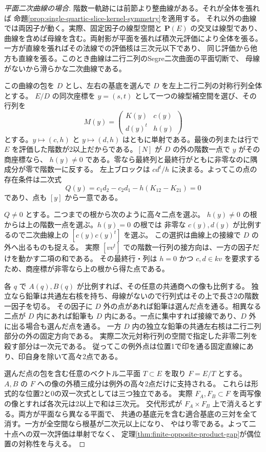 \begin{proof}[平面二次曲線の場合]
階数一軌跡には前節より整曲線がある。それが全体を張れば
命題\ref{prop:single-quartic-slice-kernel-symmetry}を適用する。
それ以外の曲線では両因子が動く。実際、固定因子の線型空間と $\mathbf P(E)$ の交叉は線型であり、
曲線を含めば母線を含む。両射影が平面を張れば積次元評価により全体を張る。
一方が直線を張ればその法線での評価核は三次元以下であり、
同じ評価から他方も直線を張る。このとき曲線は二行二列のSegre二次曲面の平面切断で、
母線がないから滑らかな二次曲線である。

この曲線の包を $D$ とし、左右の基底を選んで $D$ を左上二行二列の対称行列全体とする。
$E/D$ の同次座標を $y=(s,t)$ として一つの線型補空間を選び、その行列を
\[
 M(y)=\begin{pmatrix}K(y)&c(y)\\ d(y)^t&h(y)\end{pmatrix}
\]
とする。$y\mapsto (c,h)$ と $y\mapsto(d,h)$ はともに単射である。最後の列または行で
$E$ を評価した階数が2以上だからである。$[N]$ が $D$ の外の階数一点で $y$ がその商座標なら、
$h(y)\ne0$ である。零なら最終列と最終行がともに非零なのに隅成分が零で階数一に反する。
左上ブロックは $c d^t/h$ に決まる。よってこの点の存在条件は二次式
\[
 Q(y)=c_1d_2-c_2d_1-h(K_{12}-K_{21})=0
\]
であり、点も $[y]$ から一意である。

$Q\ne0$ とする。二つまでの根から次のように高々二点を選ぶ。
$h(y)\ne0$ の根からは上の階数一点を選ぶ。$h(y)=0$ の根では
非零な $c(y),d(y)$ が比例するので二次曲線上の $[c(y)c(y)^t]$ を選ぶ。
この選択は曲線上の接線で $D$ の外へ出るものも捉える。
実際 $[vv^t]$ での階数一行列の接方向は、一方の因子だけを動かす二項の和である。
その最終行・列は $h=0$ かつ $c,d\in kv$ を要求するため、商座標が非零なら上の根から得た点である。

各 $q$ で $A(q),B(q)$ が比例すれば、その任意の共通商への像も比例する。
独立なら鉛筆は共通左右核を持ち、母線がないので行列式はその上で長さ2の階数一因子を切る。
その因子に $D$ 外の点があれば鉛筆は選んだ点を通る。相異なる二点が $D$ 内にあれば鉛筆も
$D$ 内にある。一点に集中すれば接線であり、$D$ 外に出る場合も選んだ点を通る。
一方 $D$ 内の独立な鉛筆の共通左右核は二行二列部分の外の固定方向である。
実際二次元対称行列の空間で指定した非零二列を殺す部分は一次元である。
従ってこの例外点は位置1で印を通る固定直線にあり、印自身を除いて高々2点である。

選んだ点の包を含む任意のベクトル二平面 $T\subset E$ を取り $F=E/T$ とする。
$A,B$ の $F$ への像の外積三成分は例外の高々2点だけに支持される。
これらは形式的な位置2と0の双一次式としては三つ独立である。
実際 $F_A,F_B\subset F$ を両写像の像とすれば各次元は2以上で和は三次元。
交代形式が $F_A\times F_B$ 上で消えるとする。両方が平面なら異なる平面で、
共通の基底元を含む適合基底の三対を全て消す。一方が全空間なら根基が二次元以上になり、
やはり零である。よって二十点への双一次評価は単射でなく、
定理\ref{thm:finite-opposite-product-gap}が偶位置の対称性を与える。


\end{proof}

